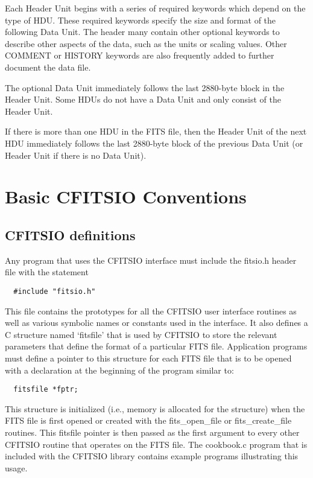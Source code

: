 Each Header Unit begins with a series of required keywords which depend
on the type of HDU.  These required keywords specify the size and
format of the following Data Unit.  The header many contain other
optional keywords to describe other aspects of the data, such as the
units or scaling values.  Other COMMENT or HISTORY keywords are also
frequently added to further document the data file.

The optional Data Unit immediately follows the last 2880-byte block in
the Header Unit.  Some HDUs do not have a Data Unit and only consist of
the Header Unit.

If there is more than one HDU in the FITS file, then the Header Unit of
the next HDU immediately follows the last 2880-byte block of the
previous Data Unit (or Header Unit if there is no Data Unit).


\chapter{  Basic CFITSIO Conventions }


\section{CFITSIO definitions}

Any program that uses the CFITSIO interface must include the fitsio.h
header file with the statement

\begin{verbatim}
  #include "fitsio.h"
\end{verbatim}
This file contains the prototypes for
all the CFITSIO user interface routines as well as various symbolic
names or constants used in the interface.  It also defines a C
structure named `fitsfile' that is used by CFITSIO to store the
relevant parameters that define the format of a particular FITS file.
Application programs must define a pointer to this structure for each
FITS file that is to be opened with a declaration
at the beginning of the program similar to:

\begin{verbatim}
  fitsfile *fptr;
\end{verbatim}
This structure is initialized (i.e., memory is allocated
for the structure) when the FITS file is first opened or created
with the fits\_open\_file or fits\_create\_file routines.  This fitsfile
pointer is then passed as the first argument to every other CFITSIO
routine that operates on the FITS file.  The cookbook.c program
that is included with the CFITSIO library contains example programs
illustrating this usage.


